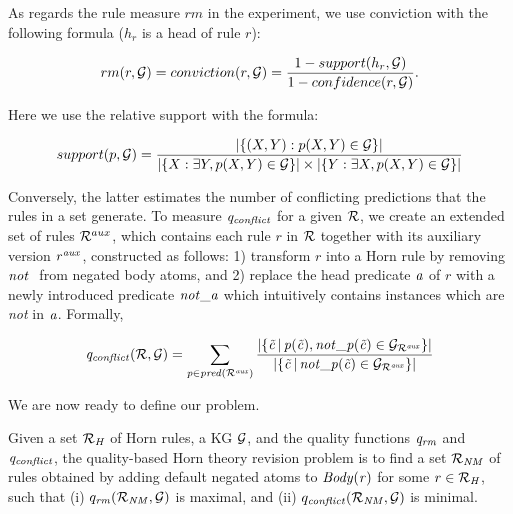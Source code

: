 
As regards the rule measure $rm$ in the experiment, we use conviction with the following formula ($h_r$ is a head of rule $r$):

\begin{equation}
rm(r, \mathcal{G})=conviction(r, \mathcal{G})= \dfrac{1 - support(h_{r}, \mathcal{G})}{1 - confidence(r, \mathcal{G})}.
\end{equation}

Here we use the relative support with the formula:

\begin{equation}
support(p, \mathcal{G})=\dfrac{|\{(X, Y): p(X, Y) \in \mathcal{G}\}|}{|\{X:\exists Y, p(X, Y) \in \mathcal{G}\}| \times |\{Y:\exists X, p(X, Y) \in \mathcal{G}\}|}
\end{equation}

Conversely, the latter estimates the number of conflicting predictions that the rules in a set generate. To measure $\mathit{q_{conflict}}$ for a given 
$\mathcal{R}$, we create an extended set of rules $\mathcal{R}^{aux}$, which contains each rule $r$ in $\mathcal{R}$ 
together with 
its auxiliary version $r^{\mathit{aux}}$, constructed as follows: 1) transform $r$ into a Horn rule by removing $\naf$ from negated body atoms, and 2) replace the head predicate $\mathit{a}$ of $r$ with a newly introduced predicate $\mathit{not\_a}$ which intuitively contains instances which are \emph{not} in $\mathit{a}$. 
Formally, 

\begin{equation}
\mathit{q_{conflict}(\mathcal{R},\mathcal{G})=\sum_{p\in pred(\mathcal{R}^{\mathit{aux}})} \dfrac{|\{ \vec{c}\,|\,p(\vec{c}),not\_p(\vec{c})\in \mathcal{G}_{\mathcal{R}^{\mathit{aux}}}\} |}{|\{ \vec{c}\,|\,not\_p(\vec{c})\in \mathcal{G}_{\mathcal{R}^{\mathit{aux}}}\} |}}
\label{eq:conflict}
\end{equation}

We are now ready to define our problem.

\begin{definition} 
Given a set $\mathcal{R}_{\mathit{H}}$ of Horn rules, a KG $\mathcal{G}$, and the quality functions $\mathit{q_{rm}}$ and $\mathit{q_{conflict}}$, the quality-based Horn theory revision problem is to find a set $\mathcal{R}_{\mathit{NM}}$ of rules obtained by adding default negated atoms to $\mathit{Body(r)}$  for some $r\in \mathcal{R}_{\mathit{H}}$, such that (i) $q_{\mathit{rm}}(\mathcal{R}_{\mathit{NM}},\mathcal{G})$ is maximal, and (ii) $q_{\mathit{conflict}}(\mathcal{R}_{\mathit{NM}},\mathcal{G})$ is minimal.
\end{definition}

